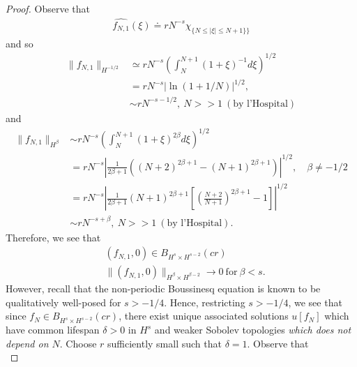 \documentclass[12pt,reqno]{amsart}
\numberwithin{equation}{section}  %
\newcommand{\wh}{\widehat}
\begin{document}
%
%
%
\begin{proof}
%
Observe that
%
%
\begin{equation}
\begin{split}
  \wh{f_{N,1}}(\xi) \doteq r N^{-s} \chi_{\{N \le |\xi| \le N + 1\}\}}
\end{split}
\end{equation}
%
and so
%
%
%
\begin{equation*}
\begin{split}
  \| f_{N,1} \|_{H^{-1/2}}
  & \simeq rN^{-s} \left( \int_{N}^{N+1} (1 + \xi)^{-1} d \xi
  \right)^{1/2}
  \\
  & = rN^{-s} \left| \ln (1 + 1/N) \right|^{1/2},
  \\
  & \sim r N^{-s - 1/2}, \ N >>1 \ (\text{by l'Hospital})
\end{split}
\end{equation*}
%
%
and 
%
\begin{equation}
  \label{llh}
\begin{split}
  \| f_{N,1} \|_{H^{\beta}}
  & \sim rN^{-s} \left( \int_{N}^{N+1} (1 + \xi)^{2\beta} d \xi
  \right)^{1/2}
  \\
  & = rN^{-s} \left| \frac{1}{2\beta+1}( (N+2)^{2\beta+1} - (N+1)^{2\beta+1} ) \right|^{1/2}, \quad \beta \neq -1/2
  \\
  & = r N^{-s} \left| {\frac{1}{2\beta+1}} (N+1)^{2 \beta + 1} \left [ \left( \frac{N+2}{N+1}
    \right)^{2\beta + 1} - 1 \right ] \right|^{1/2}  \\
  & \sim r N^{-s + \beta}, \ N >>1 \ (\text{by l'Hospital}).
\end{split}
\end{equation}
%
Therefore, we see that 
\begin{equation*}
  \begin{split}
     & (f_{N,1}, 0) \in B_{H^{s} \times H^{s-2}}(cr) 
\\
    & \|(f_{N,1}, 0)\|_{H^{\beta} \times H^{\beta -2}} \to 0 \ \text{for} \ \beta < s.
    \end{split}
\end{equation*}
However, recall that the non-periodic Boussinesq equation is known to be qualitatively well-posed for $s > -1/4$. Hence, restricting $s > -1/4$, we see that since $f_{N} \in B_{H^{s} \times H^{s-2}}(cr)$, there exist unique associated 
solutions $u[f_{N}]$ which have common lifespan $\delta > 0$ in $H^{s}$ and weaker Sobolev topologies \emph{which does not depend
on $N$}. Choose $r$ sufficiently small such that $\delta =1$.  
Observe that
%
%
\begin{equation}

\end{equation}
\end{proof}
\end{document}
